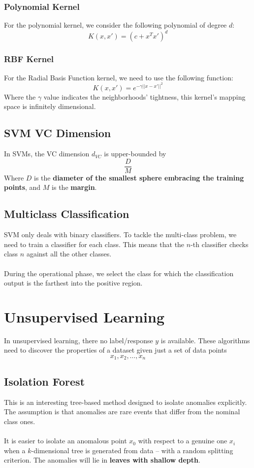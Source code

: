 \documentclass{article}
\begin{document}
\subsubsection{Polynomial Kernel}
For the polynomial kernel, we consider the following polynomial of degree $d$:
\[ K(x, x') = (c + x^Tx')^d \]


\subsubsection{RBF Kernel}
For the Radial Basis Function kernel, we need to use the following function:
\[ K(x, x') = e^{-\gamma ||x-x'||^2} \]
Where the $\gamma$ value indicates the neighborhoods' tightness, this kernel's mapping space is infinitely dimensional.

\subsection{SVM VC Dimension}
In SVMs, the VC dimension $d_{VC}$ is upper-bounded by
\[ \frac{D}{M} \]
Where $D$ is the \textbf{diameter of the smallest sphere embracing the training points}, and $M$ is the \textbf{margin}.

\subsection{Multiclass Classification}
SVM only deals with binary classifiers. To tackle the multi-class problem, we need to train a classifier for each class. This means that the $n$-th classifier checks class $n$ against all the other classes. \\ \\
During the operational phase, we select the class for which the classification output is the farthest into the positive region.

\section{Unsupervised Learning}
In unsupervised learning, there no label/response $y$ is available. These algorithms need to discover the properties of a dataset given just a set of data points
\[ x_1, x_2, \dots, x_n \]

\subsection{Isolation Forest}
This is an interesting tree-based method designed to isolate anomalies explicitly. The assumption is that anomalies are rare events that differ from the nominal class ones. \\ \\
It is easier to isolate an anomalous point $x_0$ with respect to a genuine one $x_i$ when a $k$-dimensional tree is generated from data -- with a random splitting criterion. The anomalies will lie in \textbf{leaves with shallow depth}.
\end{document}
